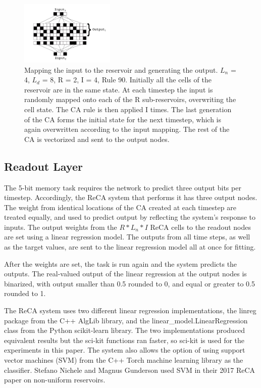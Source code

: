 \documentclass{facconf}
\begin{document}
\begin{multicols}{2}
\begin{figure}[H]
        \centering
            \includegraphics[width=0.4\textwidth]{Architecture.png}
    \caption{Mapping the input to the reservoir and generating the output.  
        $L_{n}$ = 4, $L_{d}$ = 8, R = 2, I = 4, Rule 90. Initially all the 
            cells of the reservoir are in the same state. At each timestep the 
            input is randomly mapped onto each of the R sub-reservoirs, 
                  overwriting the cell state. The CA rule is then applied I 
                      times. The last generation of the CA forms the initial 
                      state for the next timestep, which is again overwritten 
                      according to the input mapping. The rest of the CA is 
                      vectorized and sent to the output nodes. } 
        
            \label{architecture}
            \end{figure}

\subsection{Readout Layer}
The 5-bit memory task requires the network to predict three output bits per 
timestep.  Accordingly, the ReCA system that performs it has three output 
nodes.  The weight from identical locations of the CA created at each timestep 
are treated equally, and used to predict output by reflecting the system's 
response to inputs. The output weights from the $R * L_{n} * I$ ReCA cells to 
the readout nodes are set using a linear regression model. The outputs from all 
time steps, as well as the target values, are sent to the linear regression 
model all at once for fitting.  \par
After the weights are set, the task is run again and the system predicts the 
outputs. The real-valued output of the linear regression at the output nodes is 
binarized, with output smaller than 0.5 rounded to 0, and equal or greater to 
0.5 rounded to 1. \par The ReCA system uses two different linear regression 
implementations, the linreg package from the C++ AlgLib library, and the 
linear\_model.LinearRegression class from the Python scikit-learn library.  The 
two implementations produced equivalent results but the sci-kit functions ran 
faster, so sci-kit is used for the experiments in this paper. The system also 
allows the option of  using support vector machines (SVM) from the C++ Torch 
machine learning library as the classifier.  Stefano Nichele and Magnus 
Gunderson used SVM in their 2017 ReCA paper on non-uniform 
reservoirs\cite{nichele2017reservoir}.


\end{multicols}
\end{document}
